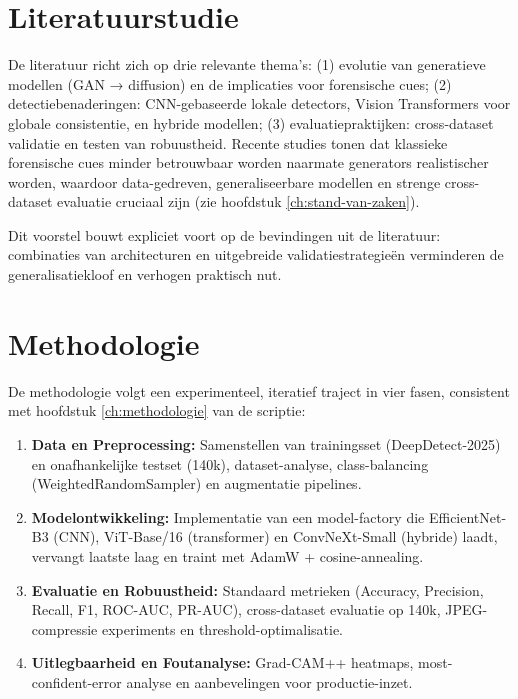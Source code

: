 \section{Literatuurstudie}%
\label{sec:literatuurstudie}

De literatuur richt zich op drie relevante thema's: (1) evolutie van generatieve modellen (GAN → diffusion) en de implicaties voor forensische cues; (2) detectiebenaderingen: CNN-gebaseerde lokale detectors, Vision Transformers voor globale consistentie, en hybride modellen; (3) evaluatiepraktijken: cross-dataset validatie en testen van robuustheid. Recente studies tonen dat klassieke forensische cues minder betrouwbaar worden naarmate generators realistischer worden, waardoor data-gedreven, generaliseerbare modellen en strenge cross-dataset evaluatie cruciaal zijn (zie hoofdstuk \ref{ch:stand-van-zaken}).

Dit voorstel bouwt expliciet voort op de bevindingen uit de literatuur: combinaties van architecturen en uitgebreide validatiestrategieën verminderen de generalisatiekloof en verhogen praktisch nut.



\section{Methodologie}%
\label{sec:methodologie}

De methodologie volgt een experimenteel, iteratief traject in vier fasen, consistent met hoofdstuk \ref{ch:methodologie} van de scriptie:
\begin{enumerate}
    \item \textbf{Data en Preprocessing:} Samenstellen van trainingsset (DeepDetect-2025) en onafhankelijke testset (140k), dataset-analyse, class-balancing (WeightedRandomSampler) en augmentatie pipelines.
    \item \textbf{Modelontwikkeling:} Implementatie van een model-factory die EfficientNet-B3 (CNN), ViT-Base/16 (transformer) en ConvNeXt-Small (hybride) laadt, vervangt laatste laag en traint met AdamW + cosine-annealing.
    \item \textbf{Evaluatie en Robuustheid:} Standaard metrieken (Accuracy, Precision, Recall, F1, ROC-AUC, PR-AUC), cross-dataset evaluatie op 140k, JPEG-compressie experiments en threshold-optimalisatie.
    \item \textbf{Uitlegbaarheid en Foutanalyse:} Grad-CAM++ heatmaps, most-confident-error analyse en aanbevelingen voor productie-inzet.
\end{enumerate}

